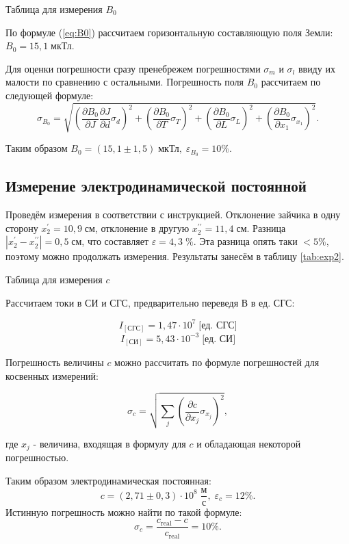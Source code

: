 \documentclass[a4paper,12pt]{article} %
\begin{document}
\begin{table}[H]
	\caption{Таблица для измерения $B_0$}
	
	\label{tab:exp1}
\end{table}

По формуле (\ref{eq:B0}) рассчитаем горизонтальную составляющую поля Земли: $B_0 = 15,1 \; \text{мкТл}$.

Для оценки погрешности сразу пренебрежем погрешностями $\sigma_m$ и $\sigma_l$ ввиду их малости по сравнению с остальными. Погрешность поля $B_0$ рассчитаем по следующей формуле:
$$\sigma_{B_0}=\sqrt{\left(\frac{\partial B_0}{\partial J}\frac{\partial J}{\partial d}\sigma_d \right)^2+\left(\frac{\partial B_0}{\partial T}\sigma_T \right)^2+\left(\frac{\partial B_0}{\partial L}\sigma_L \right)^2+\left(\frac{\partial B_0}{\partial x_1}\sigma_{x_1} \right)^2}.$$

Таким образом $B_0=\left(15,1\pm1,5\right) \; \text{мкТл}, \; \varepsilon_{B_0}=10\%$.

\subsection*{Измерение электродинамической постоянной}

Проведём измерения в соответствии с инструкцией. Отклонение зайчика в одну сторону $x^\prime_2=10,9 \; \text{см}$, отклонение в другую $x^{\prime\prime}_2=11,4 \; \text{см}$. Разница $|x^\prime_2-x^{\prime\prime}_2|=0,5 \; \text{см}$, что составляет $\varepsilon=4,3\; \%$. Эта разница опять таки $<5\%$, поэтому можно продолжать измерения. Результаты занесём в таблицу \ref{tab:exp2}.

\begin{table}[H]
	\caption{Таблица для измерения $c$}
	
	\label{tab:exp2}
\end{table}

Рассчитаем токи в СИ и СГС, предварительно переведя В в ед. СГС:

$$I_{\left[\text{СГС}\right]}=1,47\cdot10^7\;\text{[ед. СГС]}$$
$$I_{\left[\text{СИ}\right]}=5,43\cdot10^{-3}\;\text{[ед. СИ]}$$

Погрешность величины $c$ можно рассчитать по формуле погрешностей для косвенных измерений:

$$\sigma_c=\sqrt{ \sum_j \left(\frac{\partial c}{\partial x_j}\sigma_{x_j} \right)^2},$$

где $x_j$ - величина, входящая в формулу для $c$ и обладающая некоторой погрешностью.

Таким образом электродинамическая постоянная:
$$c=(2,71\pm0,3)\cdot 10^8 \; \frac{\text{м}}{\text{с}}, \; \varepsilon_c=12\%.$$
Истинную погрешность можно найти по такой формуле:
$$\sigma_c=\frac{c_\text{real}-c}{c_\text{real}}=10\%.$$
\end{document}

